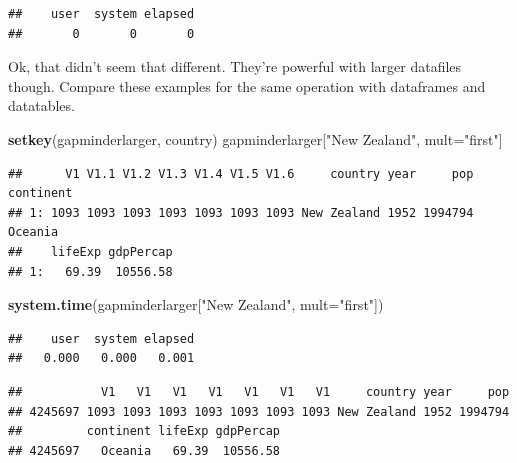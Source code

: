 \documentclass[]{article}
\newenvironment{Shaded}{\begin{snugshade}}{\end{snugshade}}
\newcommand{\KeywordTok}[1]{\textcolor[rgb]{0.13,0.29,0.53}{\textbf{{#1}}}}
\newcommand{\DataTypeTok}[1]{\textcolor[rgb]{0.13,0.29,0.53}{{#1}}}
\newcommand{\DecValTok}[1]{\textcolor[rgb]{0.00,0.00,0.81}{{#1}}}
\newcommand{\StringTok}[1]{\textcolor[rgb]{0.31,0.60,0.02}{{#1}}}
\newcommand{\NormalTok}[1]{{#1}}
\begin{document}
\begin{verbatim}
##    user  system elapsed 
##       0       0       0
\end{verbatim}

Ok, that didn't seem that different. They're powerful with larger
datafiles though. Compare these examples for the same operation with
dataframes and datatables.

\begin{Shaded}
\begin{Highlighting}[]
\KeywordTok{setkey}\NormalTok{(gapminderlarger, country)}
\NormalTok{gapminderlarger[}\StringTok{"New Zealand"}\NormalTok{, mult=}\StringTok{"first"}\NormalTok{] }
\end{Highlighting}
\end{Shaded}

\begin{verbatim}
##      V1 V1.1 V1.2 V1.3 V1.4 V1.5 V1.6     country year     pop continent
## 1: 1093 1093 1093 1093 1093 1093 1093 New Zealand 1952 1994794   Oceania
##    lifeExp gdpPercap
## 1:   69.39  10556.58
\end{verbatim}

\begin{Shaded}
\begin{Highlighting}[]
\KeywordTok{system.time}\NormalTok{(gapminderlarger[}\StringTok{"New Zealand"}\NormalTok{, }\DataTypeTok{mult=}\StringTok{"first"}\NormalTok{])}
\end{Highlighting}
\end{Shaded}

\begin{verbatim}
##    user  system elapsed 
##   0.000   0.000   0.001
\end{verbatim}

\begin{Shaded}
\end{Shaded}

\begin{verbatim}
##           V1   V1   V1   V1   V1   V1   V1     country year     pop
## 4245697 1093 1093 1093 1093 1093 1093 1093 New Zealand 1952 1994794
##         continent lifeExp gdpPercap
## 4245697   Oceania   69.39  10556.58
\end{verbatim}
\end{document}
